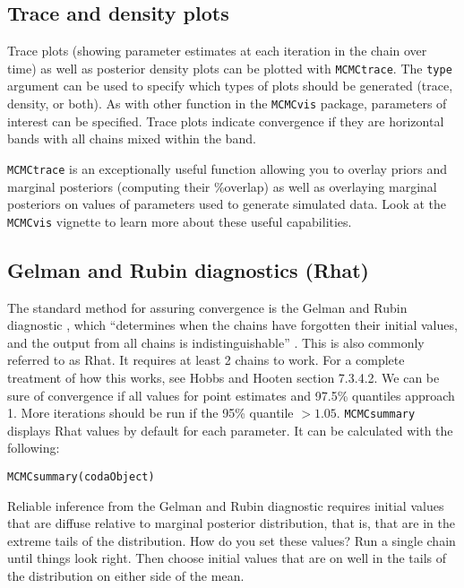 \documentclass[12pt,english]{article}
\begin{document}
\subsection{Trace and density plots}

Trace plots (showing parameter estimates at each iteration in the chain over time) as well as posterior density plots can be plotted with \texttt{MCMCtrace}. The \texttt{type} argument can be used to specify which types of plots should be generated (trace, density, or both). As with other function in the \texttt{MCMCvis} package, parameters of interest can be specified. Trace plots indicate convergence if they are horizontal bands with all chains mixed within the band.

\texttt{MCMCtrace} is an exceptionally useful function allowing you to overlay priors and marginal posteriors (computing their \%overlap) as well as overlaying marginal posteriors on values of parameters used to generate simulated data.  Look at the \texttt{MCMCvis} vignette to learn more about these useful capabilities. 

\subsection{Gelman and Rubin diagnostics (Rhat)\label{Gelman}}

The standard method for assuring convergence is the Gelman and Rubin diagnostic \citep{Gelman_Rubin}, which \enquote{determines when the chains have forgotten their initial values, and the output from all chains is indistinguishable} \citep{R-Core-Team:2015fk}. This is also commonly referred to as Rhat. It requires at least 2 chains to work. For a complete treatment of how this works, see Hobbs and Hooten \citeyearpar{hobbs2015bayesian} section 7.3.4.2. We can be sure of convergence if all values for point estimates and 97.5\% quantiles approach 1. More iterations should be run if the 95\% quantile $> 1.05$. \texttt{MCMCsummary} displays Rhat values by default for each parameter. It can be calculated with the following:

\begin{Verbatim}
MCMCsummary(codaObject)
\end{Verbatim}


Reliable inference from the Gelman and Rubin diagnostic requires initial values that are diffuse relative to marginal posterior distribution, that is, that are in the extreme tails of the distribution. How do you set these values? Run a single chain until things look right. Then choose initial values that are on well in the tails of the distribution on either side of the mean.
\end{document}
